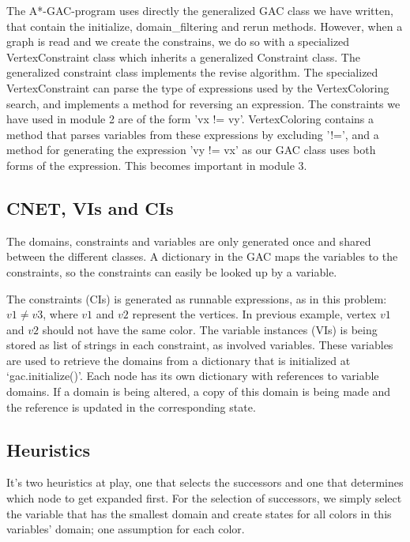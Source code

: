 

The A*-GAC-program uses directly the generalized GAC class we have written, that contain the initialize, domain_filtering and rerun methods. However, when a graph is
read and we create the constrains, we do so with a specialized VertexConstraint class which inherits a generalized Constraint class. The generalized constraint class implements the revise algorithm. The specialized VertexConstraint can parse the type of expressions used by the VertexColoring search, and implements a method for reversing an expression. The constraints we have used in module 2 are of the form 'vx != vy'. VertexColoring contains a method that parses variables from these expressions by excluding '!=', and a method for generating the expression 'vy != vx' as our GAC class uses both forms of the expression. This becomes important in module 3.

\subsection{CNET, VIs and CIs}
The domains, constraints and variables are only generated once and shared between the different classes. A dictionary in the GAC maps the variables to the constraints, so the constraints can easily be looked up by a variable.

The constraints (CIs) is generated as runnable expressions, as in this problem: \( v1 \neq v3 \), where \(v1\) and \(v2\) represent the vertices. In previous example, vertex \(v1\) and \(v2\) should not have the same color. The variable instances (VIs) is being stored as list of strings in each constraint, as involved variables. These variables are used to retrieve the domains from a dictionary that is initialized at `gac.initialize()'. Each node has its own dictionary with references to variable domains. If a domain is being altered, a copy of this domain is being made and the reference is updated in the corresponding state.

\subsection*{Heuristics}
It's two heuristics at play, one that selects the successors and one that determines which node to get expanded first. For the selection of successors, we simply select the variable that has the smallest domain and create states for all colors in this variables' domain; one assumption for each color.


